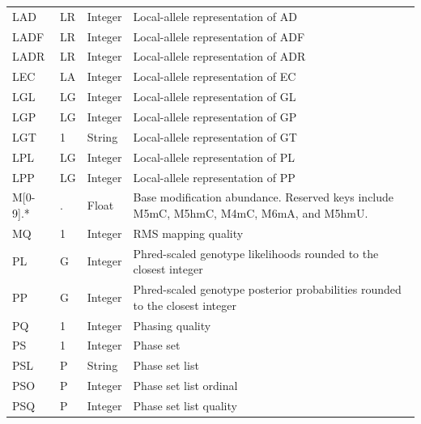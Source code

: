 \documentclass[8pt]{article}
\begin{document}
\begin{longtable}[c]{ | p{2.5cm} | p{1.5cm} | p{1.5cm} | p{10.3cm} | }
      LAD		& LR    	& Integer	& Local-allele representation of AD \\
      LADF		& LR    	& Integer	& Local-allele representation of ADF \\
      LADR		& LR    	& Integer	& Local-allele representation of ADR \\
      LEC		& LA     	& Integer	& Local-allele representation of EC \\
      LGL		& LG    	& Integer	& Local-allele representation of GL \\
      LGP		& LG    	& Integer	& Local-allele representation of GP \\
      LGT		& 1			& String 	& Local-allele representation of GT \\
      LPL		& LG    	& Integer	& Local-allele representation of PL \\
      LPP		& LG    	& Integer	& Local-allele representation of PP \\
      M[0-9].*	& .         & Float     & Base modification abundance. Reserved keys include M5mC, M5hmC, M4mC, M6mA, and M5hmU. \\
      MQ		& 1			& Integer	& RMS mapping quality \\
      PL		& G			& Integer	& Phred-scaled genotype likelihoods rounded to the closest integer \\
      PP		& G			& Integer	& Phred-scaled genotype posterior probabilities rounded to the closest integer \\
      PQ		& 1			& Integer	& Phasing quality \\
      PS		& 1			& Integer	& Phase set \\
      PSL		& P			& String	& Phase set list \\
      PSO		& P			& Integer	& Phase set list ordinal \\
      PSQ		& P			& Integer	& Phase set list quality \\

\end{longtable}
\end{document}
